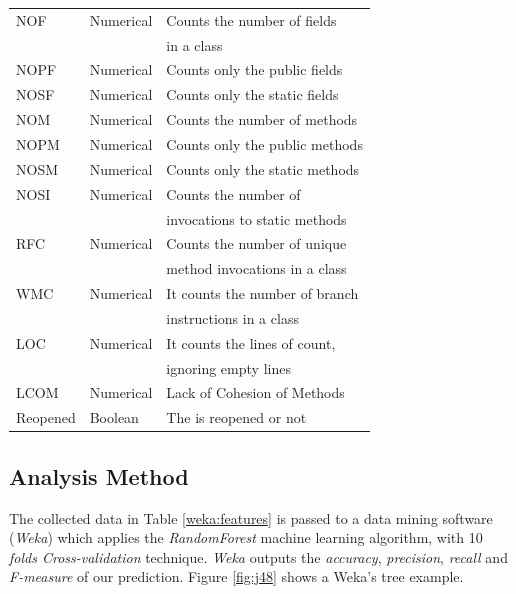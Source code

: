 \documentclass[sigconf,review]{acmart}
\begin{document}
\begin{table}[h]
\begin{tabular}{lll}
NOF &Numerical& Counts the number of fields \\&&in a class\\

NOPF&Numerical& Counts only the public fields\\

NOSF&Numerical& Counts only the static fields \\

NOM &Numerical& Counts the number of methods \\

NOPM &Numerical& Counts only the public methods \\

NOSM &Numerical& Counts only the static methods \\

NOSI &Numerical& Counts the number of \\&& invocations to static methods\\

RFC &Numerical& Counts the number of unique \\&&method invocations in a class\\

WMC &Numerical& It counts the number of branch \\&&instructions in a class\\

LOC &Numerical& It counts the lines of count, \\&&ignoring empty lines\\

LCOM &Numerical&Lack of Cohesion of Methods \\

   Reopened        & Boolean &  The is reopened or not\\
  

\hline
\hline
\end{tabular}
\end{table}

  
\newpage
\subsection{Analysis Method} 


The collected data in Table \ref{weka:features} is passed to a data mining software (\emph{Weka}) which applies the \emph{RandomForest} machine learning algorithm, with 10 \emph{folds Cross-validation} technique. \emph{Weka} outputs the \emph{accuracy}, \emph{precision}, \emph{recall} and \emph{F-measure} of our prediction. Figure \ref{fig:j48} shows a Weka's tree example.
\end{document}
